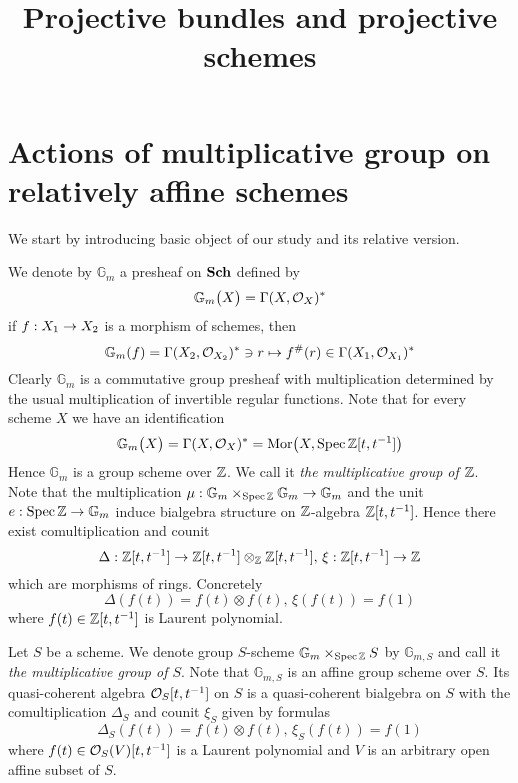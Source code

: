 



\title{Projective bundles and projective schemes}
\date{}
\maketitle

\section{Actions of multiplicative group on relatively affine schemes}
\noindent
We start by introducing basic object of our study and its relative version.

\begin{example}\label{example:multiplication_group}
We denote by $\mathbb{G}_{m}$ a presheaf on $\mathbf{Sch}$ defined by
$$\mathbb{G}_{m}\big(X\big) = \Gamma(X,{\mathcal O}_X)^*$$
if $f:X_1\rightarrow X_2$ is a morphism of schemes, then 
$$\mathbb{G}_{m}(f) = \Gamma(X_2,{\mathcal O}_{X_2})^*\ni r \mapsto f^{\#}(r)\in \Gamma(X_1,{\mathcal O}_{X_1})^*$$
Clearly $\mathbb{G}_{m}$ is a commutative group presheaf with multiplication determined by the usual multiplication of invertible regular functions. Note that for every scheme $X$ we have an identification
$$\mathbb{G}_{m}\big(X\big) = \Gamma(X,{\mathcal O}_X)^* = \mathrm{Mor}\big(X, \mathrm{Spec}\, {\mathbb Z}[t,t^{-1}]\big)$$
Hence $\mathbb{G}_{m}$ is a group scheme over ${\mathbb Z}$. We call it \textit{the multiplicative group of ${\mathbb Z}$}. Note that the multiplication $\mu:\mathbb{G}_{m}\times_{\mathrm{Spec}\, {\mathbb Z}}\mathbb{G}_{m}\rightarrow \mathbb{G}_{m}$ and the unit $e:\mathrm{Spec}\, {\mathbb Z}\rightarrow \mathbb{G}_{m}$ induce bialgebra structure on ${\mathbb Z}$-algebra ${\mathbb Z}[t,t^{-1}]$. Hence there exist comultiplication and counit 
$$\Delta:{\mathbb Z}[t,t^{-1}]\rightarrow {\mathbb Z}[t,t^{-1}]\otimes_{{\mathbb Z}}{\mathbb Z}[t,t^{-1}],\,\xi:{\mathbb Z}[t,t^{-1}]\rightarrow {\mathbb Z}$$
which are morphisms of rings. Concretely 
$$\Delta(f(t)) = f(t)\otimes f(t),\,\xi(f(t)) = f(1)$$
where $f(t)\in {\mathbb Z}[t,t^{-1}]$ is Laurent polynomial.
\end{example}

\begin{example}
Let $S$ be a scheme. We denote group $S$-scheme $\mathbb{G}_{m}\times_{\mathrm{Spec}\, {\mathbb Z}}S$ by $\mathbb{G}_{m,S}$ and call it \textit{the multiplicative group of $S$}. Note that $\mathbb{G}_{m,S}$ is an affine group scheme over $S$. Its quasi-coherent algebra ${\mathcal O}_S[t,t^{-1}]$ on $S$ is a quasi-coherent bialgebra on $S$ with the comultiplication $\Delta_S$ and counit $\xi_S$ given by formulas
$$\Delta_S(f(t)) = f(t)\otimes f(t),\,\xi_S(f(t)) = f(1)$$
where $f(t) \in {\mathcal O}_S(V)[t,t^{-1}]$ is a Laurent polynomial and $V$ is an arbitrary open affine subset of $S$.
\end{example}

